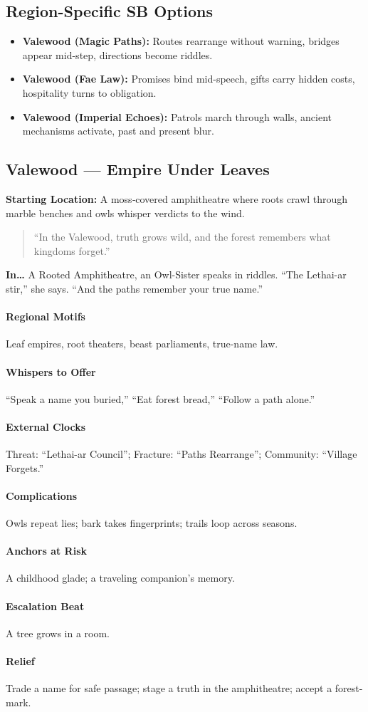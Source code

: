 \subsection*{Region-Specific SB Options}
\begin{itemize}
\item \textbf{Valewood (Magic Paths):} Routes rearrange without warning, bridges appear mid-step, directions become riddles.
\item \textbf{Valewood (Fae Law):} Promises bind mid-speech, gifts carry hidden costs, hospitality turns to obligation.
\item \textbf{Valewood (Imperial Echoes):} Patrols march through walls, ancient mechanisms activate, past and present blur.
\end{itemize}


\subsection*{Valewood — Empire Under Leaves}
\textbf{Starting Location:} A moss‑covered amphitheatre where roots crawl through marble benches and owls whisper verdicts to the wind.
\begin{quote}
“In the Valewood, truth grows wild, and the forest remembers what kingdoms forget.”
\end{quote}

\textbf{In…} A Rooted Amphitheatre, an Owl-Sister speaks in riddles. ``The Lethai-ar stir,'' she says. ``And the paths remember your true name.''
\paragraph{Regional Motifs} Leaf empires, root theaters, beast parliaments, true-name law.
\paragraph{Whispers to Offer} ``Speak a name you buried,'' ``Eat forest bread,'' ``Follow a path alone.''
\paragraph{External Clocks} Threat: ``Lethai-ar Council''; Fracture: ``Paths Rearrange''; Community: ``Village Forgets.''
\paragraph{Complications} Owls repeat lies; bark takes fingerprints; trails loop across seasons.
\paragraph{Anchors at Risk} A childhood glade; a traveling companion’s memory.
\paragraph{Escalation Beat} A tree grows in a room.
\paragraph{Relief} Trade a name for safe passage; stage a truth in the amphitheatre; accept a forest-mark.
